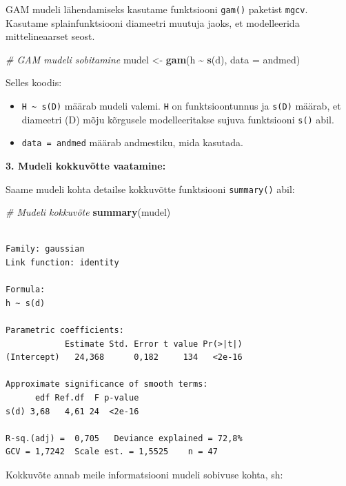 \documentclass[
]{book}
\newenvironment{Shaded}{\begin{snugshade}}{\end{snugshade}}
\newcommand{\AttributeTok}[1]{\textcolor[rgb]{0.13,0.29,0.53}{#1}}
\newcommand{\CommentTok}[1]{\textcolor[rgb]{0.56,0.35,0.01}{\textit{#1}}}
\newcommand{\FunctionTok}[1]{\textcolor[rgb]{0.13,0.29,0.53}{\textbf{#1}}}
\newcommand{\NormalTok}[1]{#1}
\newcommand{\OtherTok}[1]{\textcolor[rgb]{0.56,0.35,0.01}{#1}}
\newcommand{\SpecialCharTok}[1]{\textcolor[rgb]{0.81,0.36,0.00}{\textbf{#1}}}
\providecommand{\tightlist}{%
  \setlength{\itemsep}{0pt}\setlength{\parskip}{0pt}}
\renewenvironment{Shaded} {\begin{snugshade}\footnotesize} {\end{snugshade}}
\begin{document}
GAM mudeli lähendamiseks kasutame funktsiooni \texttt{gam()} paketist \texttt{mgcv}. Kasutame splainfunktsiooni diameetri muutuja jaoks, et modelleerida mittelineaarset seost.

\begin{Shaded}
\begin{Highlighting}[]
\CommentTok{\# GAM mudeli sobitamine}
\NormalTok{mudel }\OtherTok{\textless{}{-}} \FunctionTok{gam}\NormalTok{(h }\SpecialCharTok{\textasciitilde{}} \FunctionTok{s}\NormalTok{(d), }\AttributeTok{data =}\NormalTok{ andmed)}
\end{Highlighting}
\end{Shaded}

Selles koodis:

\begin{itemize}
\tightlist
\item
  \texttt{H\ \textasciitilde{}\ s(D)} määrab mudeli valemi. \texttt{H} on funktsioontunnus ja \texttt{s(D)} määrab, et diameetri (D) mõju kõrgusele modelleeritakse sujuva funktsiooni \texttt{s()} abil.
\item
  \texttt{data\ =\ andmed} määrab andmestiku, mida kasutada.
\end{itemize}

\textbf{3. Mudeli kokkuvõtte vaatamine:}

Saame mudeli kohta detailse kokkuvõtte funktsiooni \texttt{summary()} abil:

\begin{Shaded}
\begin{Highlighting}[]
\CommentTok{\# Mudeli kokkuvõte}
\FunctionTok{summary}\NormalTok{(mudel)}
\end{Highlighting}
\end{Shaded}

\begin{verbatim}

Family: gaussian 
Link function: identity 

Formula:
h ~ s(d)

Parametric coefficients:
            Estimate Std. Error t value Pr(>|t|)
(Intercept)   24,368      0,182     134   <2e-16

Approximate significance of smooth terms:
      edf Ref.df  F p-value
s(d) 3,68   4,61 24  <2e-16

R-sq.(adj) =  0,705   Deviance explained = 72,8%
GCV = 1,7242  Scale est. = 1,5525    n = 47
\end{verbatim}

Kokkuvõte annab meile informatsiooni mudeli sobivuse kohta, sh:
\end{document}
